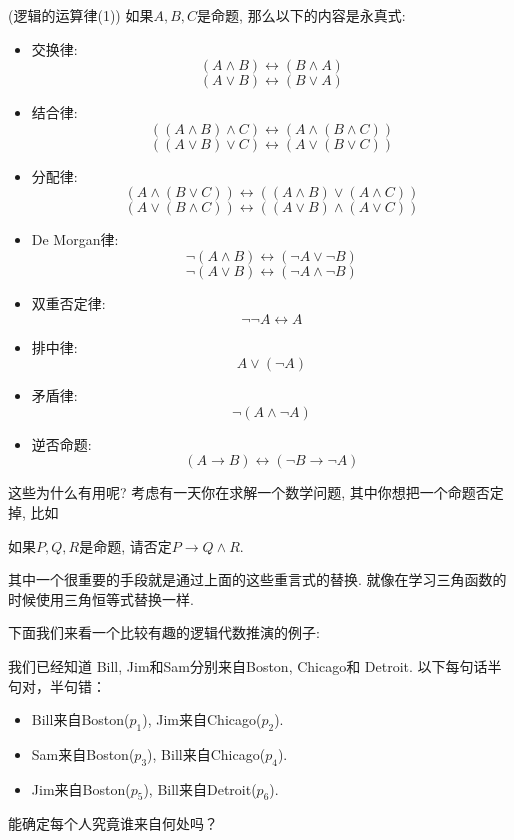 \begin{proposition}(逻辑的运算律(1))
如果$A,B,C$是命题, 那么以下的内容是永真式: 
        \begin{itemize}
            
            \item 交换律:
          \[
            (A \land B) \leftrightarrow (B \land A)
          \]
          \[
            (A \lor B) \leftrightarrow (B \lor A)
          \]
        \item 结合律:
          \[
            ((A \land B) \land C) \leftrightarrow (A \land (B \land C))
          \]
          \[
            ((A \lor B) \lor C) \leftrightarrow (A \lor (B \lor C))
          \]
        \item 分配律:
          \[
            (A \land (B \lor C)) \leftrightarrow ((A \land B) \lor (A \land C))
          \]
          \[
            (A \lor (B \land C)) \leftrightarrow ((A \lor B) \land (A \lor C))
          \]
        \item De Morgan律: 
          \[
            \lnot (A \land B) \leftrightarrow (\lnot A \lor \lnot B)
          \]
          \[
            \lnot (A \lor B) \leftrightarrow (\lnot A \land \lnot B)
          \]
          \item 双重否定律:
            \[
                \lnot \lnot A \leftrightarrow A
            \]
            \item 排中律:
            \[
                A \lor (\lnot A)
            \]
            \item 矛盾律:
            \[
                \lnot (A \land \lnot A)
            \]
            \item 逆否命题:
            \[
                (A \to B) \leftrightarrow (\lnot B \to \lnot A)
            \]
        \end{itemize}
        
      \end{proposition}

这些为什么有用呢? 考虑有一天你在求解一个数学问题, 其中你想把一个命题否定掉, 比如

\begin{prob}
	如果$P,Q,R$是命题, 请否定$P\to Q\land R$. 
\end{prob}

其中一个很重要的手段就是通过上面的这些重言式的替换. 就像在学习三角函数的时候使用三角恒等式替换一样. 

下面我们来看一个比较有趣的逻辑代数推演的例子: 
\begin{prob}
	我们已经知道 Bill, Jim和Sam分别来自Boston, Chicago和 Detroit. 以下每句话半句对，半句错：
	\begin{itemize}
		\item Bill来自Boston($p_1$), Jim来自Chicago($p_2$).
		\item Sam来自Boston($p_3$), Bill来自Chicago($p_4$).
		\item Jim来自Boston($p_5$), Bill来自Detroit($p_6$).
	\end{itemize}
	能确定每个人究竟谁来自何处吗？
\end{prob}

